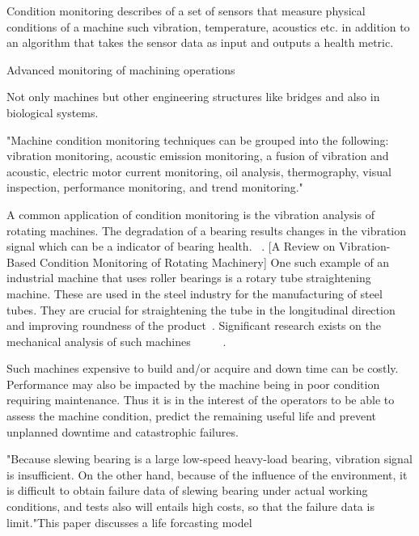 \documentclass{article}
\begin{document}
Condition monitoring describes of a set of sensors that measure physical conditions of a machine such vibration, temperature, acoustics etc. in addition to an algorithm that takes the sensor data as input and outputs a health metric.

Advanced monitoring of machining operations~\cite{teti2010advanced}

Not only machines but other engineering structures like bridges and also in biological systems.

"Machine condition monitoring techniques can be grouped into the following: vibration monitoring, acoustic emission monitoring, a fusion of vibration and acoustic, electric motor current monitoring, oil analysis, thermography, visual inspection, performance monitoring, and trend monitoring."

A common application of condition monitoring is the vibration analysis of rotating machines. The degradation of a bearing results changes in the vibration signal which can be a indicator of bearing health. ~\cite{soualhi2021novel}.
[A Review on Vibration-Based Condition Monitoring of Rotating Machinery]
One such example of an industrial machine that uses roller bearings is a rotary tube straightening machine. These are used in the steel industry for the manufacturing of steel tubes. They are crucial for straightening the tube in the longitudinal direction and improving roundness of the product~\cite{yoshimura2009effect}. Significant research exists on the mechanical analysis of such machines ~\cite{kato2014straightening}~\cite{ma2020effect}~\cite{ma2021analysis}~\cite{yu2018theoretical}~\cite{das1991mechanics}. 

Such machines expensive to build and/or acquire and down time can be costly. Performance may also be impacted by the machine being in poor condition requiring maintenance. Thus it is in the interest of the operators to be able to assess the machine condition, predict the remaining useful life and prevent unplanned downtime and catastrophic failures.

"Because slewing bearing is a large low-speed heavy-load bearing, vibration signal is insufficient. On the other hand, because of the influence of the
environment, it is difficult to obtain failure data of slewing bearing under actual working conditions, and tests also will entails high costs, so that the failure data is limit."This paper discusses a life forcasting model~\cite{wang2016multiple}
\end{document}
